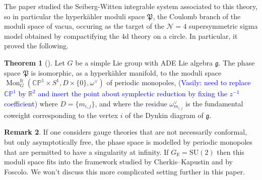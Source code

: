 \documentclass[11pt, oneside, reqno]{amsart}
\theoremstyle{definition} \newtheorem{definition}{Definition}[section]
\newtheorem{theorem}[definition]{Theorem}
\theoremstyle{definition} \newtheorem{remark}[definition]{Remark}
\theoremstyle{definition} \newtheorem{remarks}[definition]{Remarks}
\theoremstyle{definition} \newtheorem{question}[definition]{Question}
\theoremstyle{definition} \newtheorem*{note}{Note}
\theoremstyle{definition} \newtheorem{example}[definition]{Example}
\theoremstyle{definition} \newtheorem{examples}[definition]{Examples}
\renewcommand{\gg}{\mathfrak{g}}
\newcommand{\bb}[1]{\mathbb{#1}}
\newcommand{\mc}[1]{\mathcal{#1}}
\newcommand{\mf}[1]{\mathfrak{#1}}
\newcommand{\RR}{\mathbb{R}}
\newcommand{\SU}{\mathrm{SU}}
\DeclareMathOperator{\mon}{Mon}
\newcommand{\fr}{\mathrm{fr}}
\newcommand{\vasily}[1]{(\textcolor{blue}{Vasily: #1})}
\begin{document}
The paper \cite{NekrasovPestun} studied the Seiberg-Witten integrable system associated to this theory, so in particular the hyperk\"ahler moduli space $\mf P$, the Coulomb branch of the moduli space of vacua,  occuring as the target of the $\mc N=4$ supersymmetric sigma model obtained by compactifying the 4d theory on a circle.  In particular, it proved the following.

\begin{theorem}[{\cite[Section 8.1]{NekrasovPestun}}]
Let $G$ be a simple Lie group with ADE Lie algebra $\gg$.  The phase space $\mf P$ is isomorphic, as a hyperk\"ahler manifold, to the moduli space $\mon_G^\fr(\bb{CP}^1 \times S^1,D \times\{0\},\omega^\vee)$ of periodic monopoles, 
\vasily{need to replace $\mathbb{CP}^{1}$ by $\mathbb{R}^2$ and insert
  the point about symplectic reduction by fixing the $z^{-1}$ coefficient}
where $D = \{m_{i,j}\}$, and where the residue $\omega^\vee_{m_{i,j}}$ is the fundamental coweight corresponding to the vertex $i$ of the Dynkin diagram of $\gg$.
\end{theorem}

\begin{remark}
If one considers gauge theories that are not necessarily conformal, but only asymptotically free, the phase space is modelled by periodic monopoles that are permitted to have a singularity at infinity.  If $G_\RR = \SU(2)$ then this moduli space fits into the framework studied by Cherkis--Kapustin and by Foscolo.  We won't discuss this more complicated setting further in this paper.
\end{remark}
\end{document}
